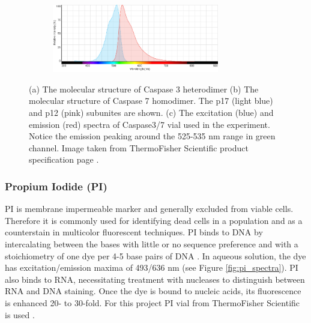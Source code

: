 \documentclass[pdftex,12pt,a4paper]{report}
\begin{document}
\begin{figure}[H]
\centering

\begin{subfigure}{\textwidth}
  \centering
  \includegraphics[width=0.8\textwidth]{images/caspase37_spectra}
  \caption{}
  \label{fig:caspase_spectra}
\end{subfigure}%

\caption[The structure and mechanism of Caspase 3/7]{(a) The molecular structure of Caspase 3 heterodimer (b) The molecular structure of Caspase 7 homodimer. The p17 (light blue) and p12 (pink) subunites are shown. (c) The excitation (blue) and emission (red) spectra of Caspase3/7 vial used in the experiment. Notice the emission peaking around the 525-535 nm range in green channel. Image taken from ThermoFisher Scientific product specification page \cite{thermofisher2018casp}.}

\label{fig:caspase_stain}
\end{figure}

\subsubsection*{Propium Iodide (PI)}

PI is membrane impermeable marker and generally excluded from viable cells. Therefore it is commonly used for identifying dead cells in a population and as a counterstain in multicolor fluorescent techniques. PI binds to DNA by intercalating between the bases with little or no sequence preference and with a stoichiometry of one dye per 4-5 base pairs of DNA \cite{suzuki1997dna}.  In aqueous solution, the dye has excitation/emission maxima of 493/636 nm (see Figure \ref{fig:pi_spectra}). PI also binds to RNA, necessitating treatment with nucleases to distinguish between RNA and DNA staining. Once the dye is bound to nucleic acids, its fluorescence is enhanced 20- to 30-fold. For this project PI vial from ThermoFisher Scientific is used \cite{thermofisher2018pi}.
\end{document}
